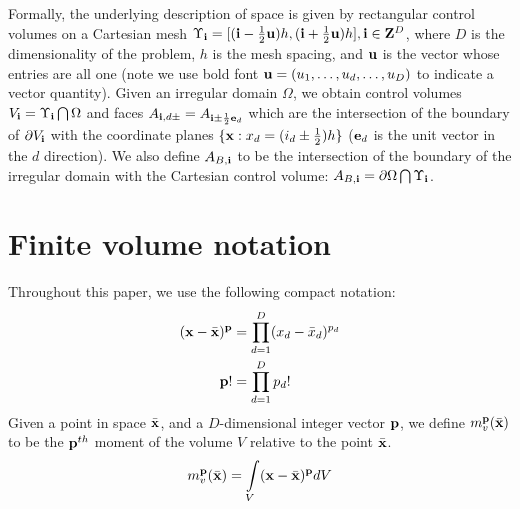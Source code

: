 \documentclass{article}
\newcommand{\ebold}{{\bf e}}
\newcommand{\ibold}{{\bf i}}
\newcommand{\pbold}{{\bf p}}
\newcommand{\ubold}{{\bf u}}
\newcommand{\xbold}{{\bf x}}
\newcommand{\bigzbold}{{\bf Z}}
\newcommand{\xbar}{{\bar {\bf x}}}
\newcommand{\half}{\frac{1}{2}}
\begin{document}
Formally, the underlying description of space
is given by rectangular control volumes on a Cartesian mesh
$\Upsilon_\ibold = [(\ibold-\half {\ubold})h, (\ibold+\half
{\ubold})h], \ibold \in \bigzbold^D$, where $D$ is the dimensionality
of the problem, $h$ is the mesh spacing, and ${\ubold}$ is the vector
whose entries are all one (note we use bold font $\ubold = (u_1, \dots, u_d,
\dots, u_D)$ to indicate a vector quantity).
Given an irregular domain $\Omega$, we
obtain control volumes $V_\ibold = \Upsilon_\ibold \bigcap \Omega$ and
faces $A_{\ibold,d\pm} = A_{\ibold \pm \half \ebold_d}$ which are the
intersection of the boundary of $\partial V_\ibold$ with the
coordinate planes $\{{\xbold}:x_d = (i_d \pm \half)h \}$ ($\ebold_d$ is
the unit vector in the $d$ direction).  We also
define $A_{B,\ibold}$ to be the intersection of the boundary of the
irregular domain with the Cartesian control volume: $A_{B,\ibold}
= \partial \Omega \bigcap \Upsilon_\ibold$. 


\section {Finite volume notation}

Throughout this paper, we use the following compact notation:
\begin{align*}
(\xbold - \xbar)^\pbold &= \prod\limits^D_{d=1} (x_d - {\bar x}_d)^{p_d} \\
\pbold! &= \prod\limits^D_{d = 1} p_d!
\end{align*}
Given a point in space $\xbar$, and a $D$-dimensional integer vector
$\pbold$, we define $m_v^\pbold(\xbar)$ to be the $\pbold^{th}$
moment of the volume $V$ relative to the point $\xbar$.
\begin{equation}
m_v^\pbold(\xbar)  =  \int\limits_{V} (\xbold - \xbar)^\pbold dV
\label{eqn::volmoment}
\end{equation}
\end{document}
